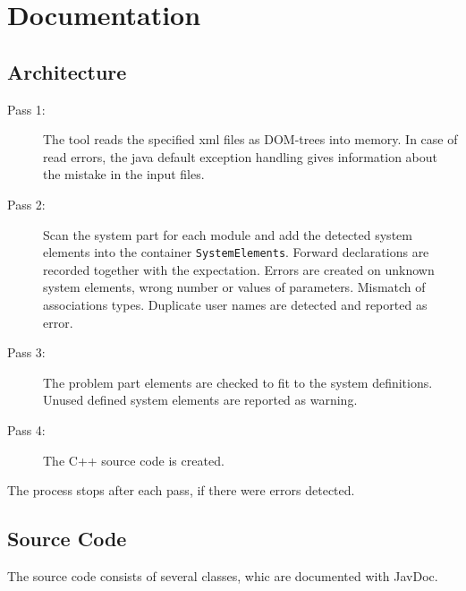 \chapter{Documentation}

\section{Architecture}

\begin{description}
\item[Pass 1:]
The tool reads the specified xml files as DOM-trees into memory.
In case of read errors, the java default exception handling
gives information about the mistake in the input files.

\item [Pass 2:]
Scan the system part for each module and add the detected system elements
into the container \verb|SystemElements|. Forward declarations are 
recorded together with the expectation. 
Errors are created on unknown system elements, wrong number or values
of parameters. Mismatch of  associations types.
Duplicate user names are detected and reported as error.

\item[Pass 3:]
The problem part elements are checked to fit to the system definitions.
Unused defined system elements are reported as warning.

\item[Pass 4:]
The C++ source code is created.

\end{description}

The process stops after each pass, if there were errors detected.

\section{Source Code}
The source code consists of several classes, whic are documented with JavDoc.

